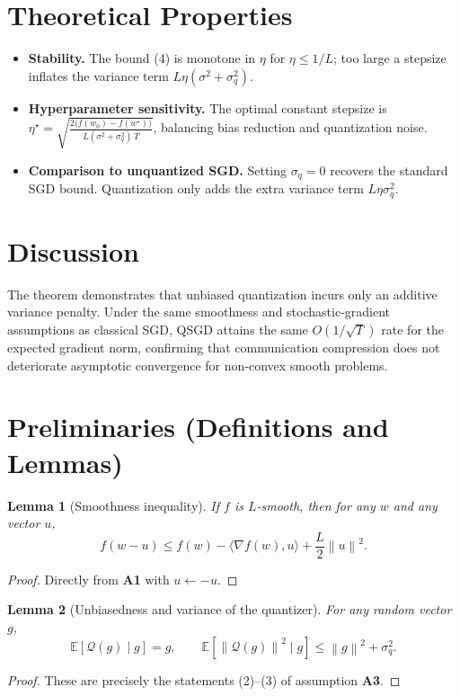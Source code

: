 \documentclass{article}
\newcommand{\E}{\mathbb{E}}
\newcommand{\norm}[1]{\left\lVert #1\right\rVert}
\newcommand{\Qop}{\mathcal{Q}}
\newtheorem{lemma}{Lemma}
\begin{document}
\section*{Theoretical Properties}
\begin{itemize}
\item \textbf{Stability.} The bound (4) is monotone in $\eta$ for $\eta\le 1/L$; too large a stepsize inflates the variance term $L\eta(\sigma^{2}+\sigma_q^{2})$.
\item \textbf{Hyperparameter sensitivity.} The optimal constant stepsize is $\eta^{\star}= \sqrt{\frac{2\big(f(w_0)-f(w^{\star})\big)}{L(\sigma^{2}+\sigma_q^{2})\,T}}$, balancing bias reduction and quantization noise.
\item \textbf{Comparison to unquantized SGD.} Setting $\sigma_q=0$ recovers the standard SGD bound. Quantization only adds the extra variance term $L\eta\sigma_q^{2}$.
\end{itemize}

\section*{Discussion}
The theorem demonstrates that unbiased quantization incurs only an additive variance penalty.  Under the same smoothness and stochastic‑gradient assumptions as classical SGD, QSGD attains the same $O(1/\sqrt{T})$ rate for the expected gradient norm, confirming that communication compression does not deteriorate asymptotic convergence for non‑convex smooth problems.

\newpage
\section*{Preliminaries (Definitions and Lemmas)}
\begin{lemma}[Smoothness inequality]\label{lem:smooth}
If $f$ is $L$‑smooth, then for any $w$ and any vector $u$,
\[
f(w-u)\le f(w)-\langle\nabla f(w),u\rangle+\frac{L}{2}\norm{u}^{2}.
\tag{5}
\]
\end{lemma}
\begin{proof}
Directly from \textbf{A1} with $u\leftarrow -u$.
\end{proof}

\begin{lemma}[Unbiasedness and variance of the quantizer]\label{lem:quant}
For any random vector $g$,
\[
\E\!\left[\Qop(g)\mid g\right]=g,\qquad
\E\!\left[\norm{\Qop(g)}^{2}\mid g\right]\le \norm{g}^{2}+\sigma_{q}^{2}.
\tag{6}
\]
\end{lemma}
\begin{proof}
These are precisely the statements (2)–(3) of assumption \textbf{A3}.
\end{proof}
\end{document}
